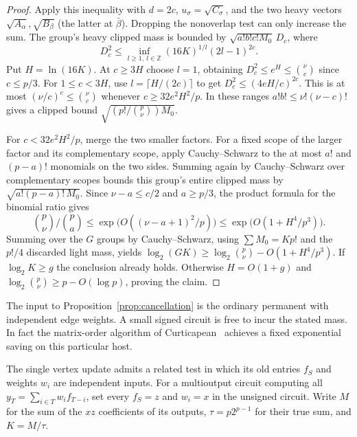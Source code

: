 \documentclass[11pt]{article}
\theoremstyle{definition}
\begin{document}
\begin{proof}
Apply this inequality with \(d=2c\), \(u_\sigma=\sqrt{C_\sigma}\), and the two heavy vectors \(\sqrt{A_\alpha},\sqrt{B_\beta}\) (the latter at \(\bar\beta\)). Dropping the nonoverlap test can only increase the sum. The group's heavy clipped mass is bounded by \(\sqrt{a!b!c!M_0}\,D_c\), where
\[
               D_c^2\le\inf_{l\ge1,\ l\in\mathbb Z}
                      (16K)^{1/l}(2l-1)^{2c}.
\]
Put \(H=\ln(16K)\). At \(c\ge3H\) choose \(l=1\), obtaining \(D_c^2\le e^H\le\binom \nu c\) since \(c\le p/3\). For \(1\le c<3H\), use \(l=\lceil H/(2c)\rceil\) to get \(D_c^2\le(4eH/c)^{2c}\). This is at most \((\nu/c)^c\le\binom \nu c\) whenever \(c\ge32e^2H^2/p\). In these ranges \(a!b!\le \nu!(\nu-c)!\) gives a clipped bound \(\sqrt{(p!/\binom p\nu)M_0}\).

For \(c<32e^2H^2/p\), merge the two smaller factors. For a fixed scope of the larger factor and its complementary scope, apply Cauchy--Schwarz to the at most \(a!\) and \((p-a)!\) monomials on the two sides. Summing again by Cauchy--Schwarz over complementary scopes bounds this group's entire clipped mass by \(\sqrt{a!(p-a)!\,M_0}\). Since \(\nu-a\le c/2\) and \(a\ge p/3\), the product formula for the binomial ratio gives
\[
      \binom p\nu/\binom pa
       \le\exp\bigl(O((\nu-a+1)^2/p)\bigr)
       \le\exp\bigl(O(1+H^4/p^3)\bigr).
\]
Summing over the \(G\) groups by Cauchy--Schwarz, using \(\sum M_0=Kp!\) and the \(p!/4\) discarded light mass, yields
\(\log_2(GK)\ge \log_2\binom p\nu-O(1+H^4/p^3)\).
If \(\log_2 K\ge g\) the conclusion already holds. Otherwise \(H=O(1+g)\) and \(\log_2\binom p\nu\ge p-O(\log p)\), proving the claim.
\end{proof}

The input to Proposition~\ref{prop:cancellation} is the ordinary permanent with independent edge weights. A small signed circuit is free to incur the stated mass. In fact the matrix-order algorithm of Curticapean~\cite{stars} achieves a fixed exponential saving on this particular host.

The single vertex update admits a related test in which its old entries \(f_S\) and weights \(w_i\) are independent inputs. For a multioutput circuit computing all \(y_T=\sum_{i\in T}w_i f_{T-i}\), set every \(f_S=z\) and \(w_i=x\) in the unsigned circuit. Write \(M\) for the sum of the \(xz\) coefficients of its outputs, \(\tau=p2^{p-1}\) for their true sum, and \(K=M/\tau\).
\end{document}
